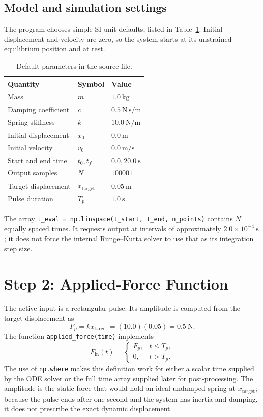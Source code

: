 \documentclass[11pt]{article}
\begin{document}
\subsection{Model and simulation settings}
The program chooses simple SI-unit defaults, listed in Table~\ref{tab:parameters}. Initial displacement and velocity are zero, so the system starts at its unstrained equilibrium position and at rest.

\begin{table}[htbp]
\centering
\caption{Default parameters in the source file.}
\label{tab:parameters}
\begin{tabular}{lll}
\toprule
Quantity & Symbol & Value \\
\midrule
Mass & $m$ & $1.0\ \mathrm{kg}$ \\
Damping coefficient & $c$ & $0.5\ \mathrm{N\,s/m}$ \\
Spring stiffness & $k$ & $10.0\ \mathrm{N/m}$ \\
Initial displacement & $x_0$ & $0.0\ \mathrm{m}$ \\
Initial velocity & $v_0$ & $0.0\ \mathrm{m/s}$ \\
Start and end time & $t_0,t_f$ & $0.0,20.0\ \mathrm{s}$ \\
Output samples & $N$ & $100001$ \\
Target displacement & $x_{\mathrm{target}}$ & $0.05\ \mathrm{m}$ \\
Pulse duration & $T_p$ & $1.0\ \mathrm{s}$ \\
\bottomrule
\end{tabular}
\end{table}

The array \texttt{t\_eval = np.linspace(t\_start, t\_end, n\_points)} contains $N$ equally spaced times. It requests output at intervals of approximately $2.0\times10^{-4}\ \mathrm{s}$; it does not force the internal Runge--Kutta solver to use that as its integration step size.

\section{Step 2: Applied-Force Function}
The active input is a rectangular pulse. Its amplitude is computed from the target displacement as
\begin{equation}
 F_p=kx_{\mathrm{target}}=(10.0)(0.05)=0.5\ \mathrm{N}.
\end{equation}
The function \texttt{applied\_force(time)} implements
\begin{equation}
F_{\mathrm{in}}(t)=
\begin{cases}
F_p, & t\leq T_p,\\
0, & t>T_p.
\end{cases}
\label{eq:pulse}
\end{equation}
The use of \texttt{np.where} makes this definition work for either a scalar time supplied by the ODE solver or the full time array supplied later for post-processing. The amplitude is the static force that would hold an ideal undamped spring at $x_{\mathrm{target}}$; because the pulse ends after one second and the system has inertia and damping, it does not prescribe the exact dynamic displacement.
\end{document}
